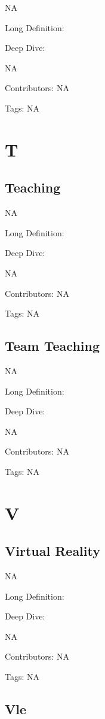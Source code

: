 \documentclass[
  letterpaper,
  DIV=11,
  numbers=noendperiod]{scrreprt}
\begin{document}
NA

Long Definition:

Deep Dive:

NA

Contributors: NA

Tags: NA


\chapter{T}\label{t}

\section{Teaching}\label{teaching}

NA

Long Definition:

Deep Dive:

NA

Contributors: NA

Tags: NA

\section{Team Teaching}\label{team-teaching}

NA

Long Definition:

Deep Dive:

NA

Contributors: NA

Tags: NA


\chapter{V}\label{v}

\section{Virtual Reality}\label{virtual-reality}

NA

Long Definition:

Deep Dive:

NA

Contributors: NA

Tags: NA

\section{Vle}\label{vle}
\end{document}
